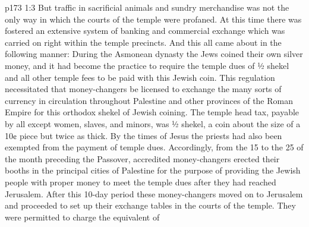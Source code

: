\vs p173 1:3 \pc But traffic in sacrificial animals and sundry merchandise was not the only way in which the courts of the temple were profaned. At this time there was fostered an extensive system of banking and commercial exchange which was carried on right within the temple precincts. And this all came about in the following manner: During the Asmonean dynasty the Jews coined their own silver money, and it had become the practice to require the temple dues of ½ shekel and all other temple fees to be paid with this Jewish coin. This regulation necessitated that money\hyp{}changers be licensed to exchange the many sorts of currency in circulation throughout Palestine and other provinces of the Roman Empire for this orthodox shekel of Jewish coining. The temple head tax, payable by all except women, slaves, and minors, was ½ shekel, a coin about the size of a 10¢ piece but twice as thick. By the times of Jesus the priests had also been exempted from the payment of temple dues. Accordingly, from the 15 to the 25 of the month preceding the Passover, accredited money\hyp{}changers erected their booths in the principal cities of Palestine for the purpose of providing the Jewish people with proper money to meet the temple dues after they had reached Jerusalem. After this 10\hyp{}day period these money\hyp{}changers moved on to Jerusalem and proceeded to set up their exchange tables in the courts of the temple. They were permitted to charge the equivalent of 
